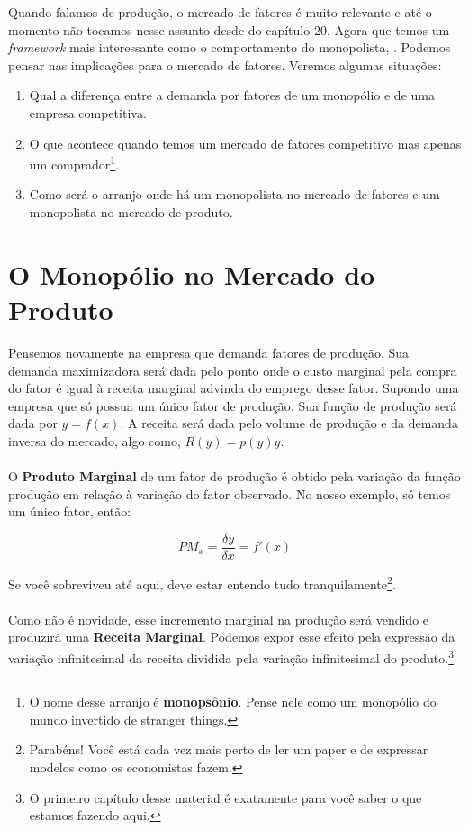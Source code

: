 \documentclass[a4paper,11pt,oneside]{book}
\theoremstyle{definition}
\theoremstyle{break}
\begin{document}
Quando falamos de produção, o mercado de fatores é muito relevante e até o momento não tocamos nesse assunto desde do capítulo 20. Agora que temos um \textit{framework} mais interessante como o comportamento do monopolista,
. Podemos pensar nas implicações para o mercado de fatores. Veremos algumas situações: 
\begin{enumerate}
	\item Qual a diferença entre a demanda por fatores de um monopólio e de uma empresa competitiva.

	\item O que acontece quando temos um mercado de fatores competitivo mas apenas um comprador\footnote{O nome desse arranjo é \textbf{monopsônio}. Pense nele como um monopólio do mundo invertido de stranger things.}.

	\item Como será o arranjo onde há um monopolista no mercado de fatores e um monopolista no mercado de produto.
\end{enumerate}

\section{O Monopólio no Mercado do Produto}

Pensemos novamente na empresa que demanda fatores de produção. Sua demanda maximizadora será dada pelo ponto onde o custo marginal pela compra do fator é igual à receita marginal advinda do emprego desse fator. Supondo uma empresa que só possua um único fator de produção. Sua função de produção será dada por $y = f(x)$. A receita será dada pelo volume de produção e da demanda inversa do mercado, algo como, $R(y) = p(y)y$. 
\\~\\
O \textbf{Produto Marginal} de um fator de produção é obtido pela variação da função produção em relação à variação do fator observado. No nosso exemplo, só temos um único fator, então:

$$ PM_x = \frac{\delta y}{\delta x} = f'(x) $$

Se você sobreviveu até aqui, deve estar entendo tudo tranquilamente\footnote{Parabéns! Você está cada vez mais perto de ler um paper e de expressar modelos como os economistas fazem.}. 
\\~\\
Como não é novidade, esse incremento marginal na produção será vendido e produzirá uma \textbf{Receita Marginal}. Podemos expor esse efeito pela expressão da  variação infinitesimal da receita dividida pela variação infinitesimal do produto.\footnote{O primeiro capítulo desse material é exatamente para você saber o que estamos fazendo aqui.}
\end{document}
